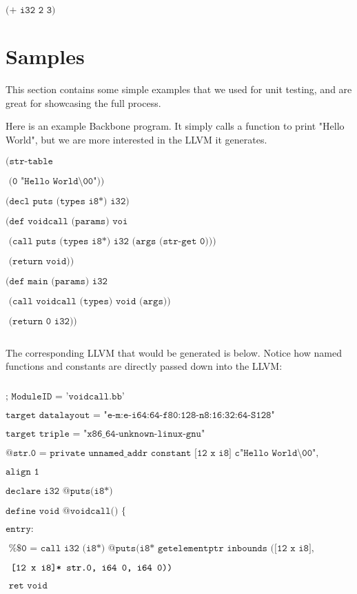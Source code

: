 \documentclass[journal=jacsat, manuscript=article]{achemso}
\begin{document}
$\texttt{}$

$\texttt{(+ i32 2 3)}$

\section{Samples}

This section contains some simple examples that we used for unit testing, and are great for showcasing the full process.

Here is an example Backbone program. It simply calls a function to print "Hello World", but we are more interested in the LLVM it generates.

$\texttt{(str-table}$

$\texttt{  (0 "Hello World\textbackslash00"))}$


$\texttt{(decl puts (types i8*) i32)}$


$\texttt{(def voidcall (params) voi}$

$\texttt{  (call puts (types i8*) i32 (args (str-get 0)))}$

$\texttt{  (return void))}$


$\texttt{(def main (params) i32}$

$\texttt{  (call voidcall (types) void (args))}$

$\texttt{  (return 0 i32))}$

$\texttt{}$


The corresponding LLVM that would be generated is below. Notice how named functions and constants are directly passed down into the LLVM:

$\texttt{}$


$\texttt{; ModuleID = 'voidcall.bb'}$

$\texttt{target datalayout = "e-m:e-i64:64-f80:128-n8:16:32:64-S128"}$

$\texttt{target triple = "x86\_64-unknown-linux-gnu"}$

$\texttt{@str.0 = private unnamed\_addr constant [12 x i8] c"Hello World\textbackslash00",}$

$\texttt{align 1}$

$\texttt{declare i32 @puts(i8*)}$

$\texttt{define void @voidcall() \{}$

$\texttt{entry:}$

$\texttt{  \%\$0 = call i32 (i8*) @puts(i8* getelementptr inbounds ([12 x i8], }$

$\texttt{  [12 x i8]* \@str.0, i64 0, i64 0)) }$

$\texttt{  ret void}$
\end{document}
